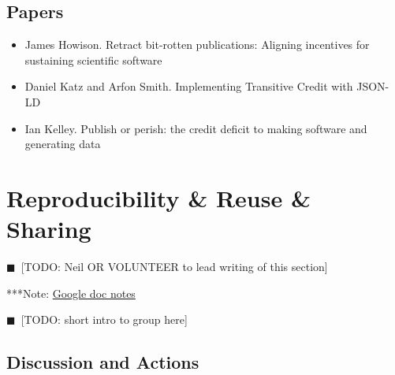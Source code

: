 \documentclass[11pt, oneside]{amsart}
\newcommand{\todo}[1]{{\color{blue}$\blacksquare$~\textsf{[TODO: #1]}}}
\newcommand{\note}[1]{ {\textcolor{blueish}    { ***Note:      #1 }}}
\begin{document}
\subsection{Papers}
\begin{itemize}
\item James Howison. Retract bit-rotten publications: Aligning incentives for
sustaining scientific software~\cite{wssspe2_howison}

\item Daniel Katz and Arfon Smith. Implementing Transitive Credit with
{JSON-LD}~\cite{wssspe2_katz}

\item Ian Kelley. Publish or perish: the credit deficit to making software and
generating data~\cite{wssspe2_kelley}
\end{itemize}

\section{Reproducibility \& Reuse \& Sharing}
\todo{Neil OR VOLUNTEER to lead writing of this section}

\note{\href{http://tinyurl.com/kqpe87z}{Google doc notes}}

\todo{short intro to group here}

\subsection{Discussion and Actions}

\end{document}
